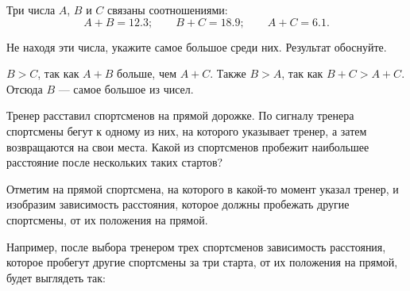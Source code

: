 \begin{itemize}

	\itB Три числа $A$, $B$ и $C$ связаны соотношениями:
	$$A+B = 12.3;\qquad
		B+C=18.9;\qquad
		A+C=6.1.$$

	Не находя эти числа, укажите самое большое среди них. Результат обоснуйте.
	
	\itr $B>C$, так как $A+B$ больше, чем $A+C$. Также $B>A$, так как $B+C>A+C$. Отсюда $B$ — самое большое из чисел.
	
	\itC Тренер расставил спортсменов на прямой дорожке. По сигналу тренера спортсмены бегут к одному из них, на которого указывает тренер, а затем возвращаются на свои места. Какой из спортсменов пробежит наибольшее расстояние после нескольких таких стартов?
	
	\itr Отметим на прямой спортсмена, на которого в какой-то момент указал тренер, и изобразим зависимость расстояния, которое должны пробежать другие спортсмены, от их положения на прямой.
	
	\begin{center}  \end{center}
	
	Например, после выбора тренером трех спортсменов зависимость расстояния, которое пробегут другие спортсмены за три старта, от их положения на прямой, будет выглядеть так:
	
	\begin{center}  \end{center}
	

\end{itemize}
